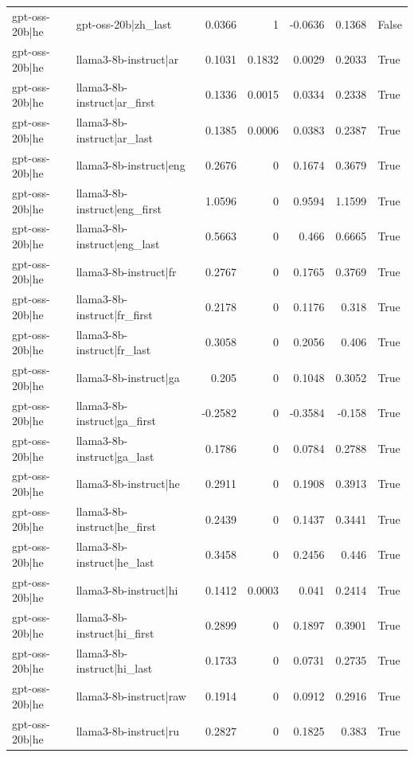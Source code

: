 \begin{table}
\begin{tabular}{l l r r r r l}
gpt-oss-20b|he & gpt-oss-20b|zh_last & 0.0366 & 1 & -0.0636 & 0.1368 & False \\
gpt-oss-20b|he & llama3-8b-instruct|ar & 0.1031 & 0.1832 & 0.0029 & 0.2033 & True \\
gpt-oss-20b|he & llama3-8b-instruct|ar_first & 0.1336 & 0.0015 & 0.0334 & 0.2338 & True \\
gpt-oss-20b|he & llama3-8b-instruct|ar_last & 0.1385 & 0.0006 & 0.0383 & 0.2387 & True \\
gpt-oss-20b|he & llama3-8b-instruct|eng & 0.2676 & 0 & 0.1674 & 0.3679 & True \\
gpt-oss-20b|he & llama3-8b-instruct|eng_first & 1.0596 & 0 & 0.9594 & 1.1599 & True \\
gpt-oss-20b|he & llama3-8b-instruct|eng_last & 0.5663 & 0 & 0.466 & 0.6665 & True \\
gpt-oss-20b|he & llama3-8b-instruct|fr & 0.2767 & 0 & 0.1765 & 0.3769 & True \\
gpt-oss-20b|he & llama3-8b-instruct|fr_first & 0.2178 & 0 & 0.1176 & 0.318 & True \\
gpt-oss-20b|he & llama3-8b-instruct|fr_last & 0.3058 & 0 & 0.2056 & 0.406 & True \\
gpt-oss-20b|he & llama3-8b-instruct|ga & 0.205 & 0 & 0.1048 & 0.3052 & True \\
gpt-oss-20b|he & llama3-8b-instruct|ga_first & -0.2582 & 0 & -0.3584 & -0.158 & True \\
gpt-oss-20b|he & llama3-8b-instruct|ga_last & 0.1786 & 0 & 0.0784 & 0.2788 & True \\
gpt-oss-20b|he & llama3-8b-instruct|he & 0.2911 & 0 & 0.1908 & 0.3913 & True \\
gpt-oss-20b|he & llama3-8b-instruct|he_first & 0.2439 & 0 & 0.1437 & 0.3441 & True \\
gpt-oss-20b|he & llama3-8b-instruct|he_last & 0.3458 & 0 & 0.2456 & 0.446 & True \\
gpt-oss-20b|he & llama3-8b-instruct|hi & 0.1412 & 0.0003 & 0.041 & 0.2414 & True \\
gpt-oss-20b|he & llama3-8b-instruct|hi_first & 0.2899 & 0 & 0.1897 & 0.3901 & True \\
gpt-oss-20b|he & llama3-8b-instruct|hi_last & 0.1733 & 0 & 0.0731 & 0.2735 & True \\
gpt-oss-20b|he & llama3-8b-instruct|raw & 0.1914 & 0 & 0.0912 & 0.2916 & True \\
gpt-oss-20b|he & llama3-8b-instruct|ru & 0.2827 & 0 & 0.1825 & 0.383 & True \\

\end{tabular}
\end{table}
